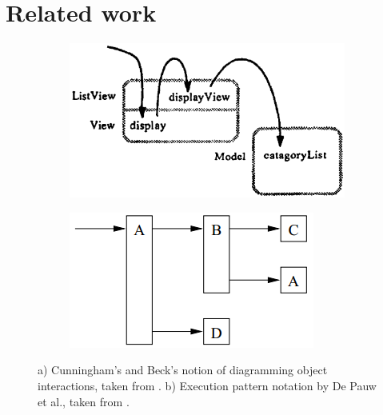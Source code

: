 \chapter{Related work}
\label{c:relatedwork}


\begin{figure}[b]
	\centering
	
	\begin{subfigure}[b]{0.45\textwidth}
		\centering
        \includegraphics[width=\textwidth]{../images/06-Cunningham-Diagram}
        \caption[Object Interaction Diagrams by Cunningham and Beck]{}
		\label{fig:06-1-Cunningham}
	\end{subfigure}
	\quad
	\begin{subfigure}[b]{0.45\textwidth}
		\centering
		\includegraphics[width=\textwidth]{../images/06-DePauw-ExecutionPattern}
		\caption[Execution Pattern Notation by De Pauw et al.]{}
		\label{fig:06-1-DePauw}
	\end{subfigure}
	
	\caption[TOC Caption]{
		a) Cunningham's and Beck's notion of diagramming object interactions, taken from \cite{cunningham_diagram_1986}.
		b) Execution pattern notation by De Pauw et al., taken from \cite{de_pauw_execution_1998}.
	}
	\label{fig:06-1}
\end{figure}

